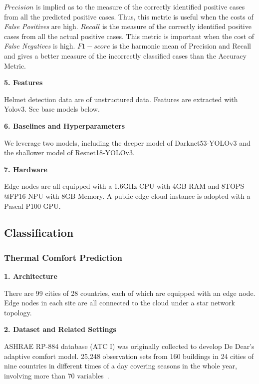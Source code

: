 $Precision$ is implied as to the measure of the correctly identified positive cases from all the predicted positive cases. Thus, this metric is useful when the costs of \textit{False Positives} are high. $Recall$ is the measure of the correctly identified positive cases from all the actual positive cases. This metric is important when the cost of \textit{False Negatives} is high. $F1-score$ is the harmonic mean of Precision and Recall and gives a better measure of the incorrectly classified cases than the Accuracy Metric.

\noindent
\textbf{5. Features}

Helmet detection data are of unstructured data. Features are extracted with Yolov3. See base models below. 

\noindent
\textbf{6. Baselines and Hyperparameters}

We leverage two models, including the deeper model of  Darknet53-YOLOv3 and the shallower model of Resnet18-YOLOv3. 

\noindent
\textbf{7. Hardware}

Edge nodes are all equipped with a 1.6GHz CPU with 4GB RAM and 8TOPS @FP16 NPU with 8GB Memory. A public edge-cloud instance is adopted with a Pascal P100 GPU. 





\subsection{Classification}

\subsubsection{Thermal Comfort Prediction} 

\noindent
\textbf{1. Architecture}

There are 99 cities of 28 countries, each of which are equipped with an edge node. Edge nodes in each site are all connected to the cloud under a star network topology.

\noindent
\textbf{2. Dataset and Related Settings}

ASHRAE RP-884 database (ATC I) was originally collected to develop De Dear's adaptive comfort model. 25,248 observation sets from 160 buildings in 24 cities of nine countries in different times of a day covering seasons in the whole year, involving more than 70 variables~\cite{de97,arp18}.

